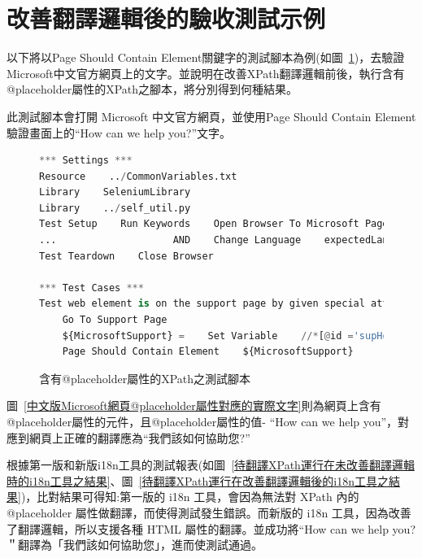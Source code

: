 \section{改善翻譯邏輯後的驗收測試示例}
以下將以Page Should Contain Element關鍵字的測試腳本為例(如圖~\ref{含有@placeholder屬性的XPath之測試腳本})，去驗證Microsoft中文官方網頁上的文字。並說明在改善XPath翻譯邏輯前後，執行含有@placeholder屬性的XPath之腳本，將分別得到何種結果。

此測試腳本會打開 Microsoft 中文官方網頁，並使用Page Should Contain Element驗證畫面上的“How can we help you?”文字。
\begin{figure}[H]
\begin{lstlisting}[language={python}]
*** Settings ***
Resource    ../CommonVariables.txt
Library    SeleniumLibrary
Library    ../self_util.py
Test Setup    Run Keywords    Open Browser To Microsoft Page
...                    AND    Change Language    expectedLanguage=${language}
Test Teardown    Close Browser

*** Test Cases ***
Test web element is on the support page by given special attributes
    Go To Support Page
    ${MicrosoftSupport} =    Set Variable    //*[@id ='supHomeAndLandingPageSearchBox' and @placeholder ='How can we help you?']
    Page Should Contain Element    ${MicrosoftSupport}
\end{lstlisting}
\caption{含有@placeholder屬性的XPath之測試腳本}
\label{含有@placeholder屬性的XPath之測試腳本}
\end{figure}

圖~\ref{中文版Microsoft網頁@placeholder屬性對應的實際文字}則為網頁上含有@placeholder屬性的元件，且@placeholder屬性的值- “How can we help you”，對應到網頁上正確的翻譯應為“我們該如何協助您?”

根據第一版和新版i18n工具的測試報表(如圖~\ref{待翻譯XPath運行在未改善翻譯邏輯時的i18n工具之結果}、圖~\ref{待翻譯XPath運行在改善翻譯邏輯後的i18n工具之結果})，比對結果可得知:第一版的 i18n 工具，會因為無法對 XPath 內的@placeholder 屬性做翻譯，而使得測試發生錯誤。而新版的 i18n 工具，因為改善了翻譯邏輯，所以支援各種 HTML 屬性的翻譯。並成功將“How can we help you?＂翻譯為「我們該如何協助您」，進而使測試通過。


